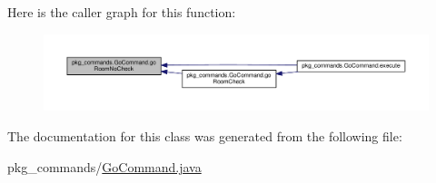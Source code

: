 Here is the caller graph for this function\-:
\nopagebreak
\begin{figure}[H]
\begin{center}
\leavevmode
\includegraphics[width=350pt]{classpkg__commands_1_1GoCommand_a210afbc5f3ef34d3ad5759d853c8f8c2_icgraph}
\end{center}
\end{figure}




The documentation for this class was generated from the following file\-:\begin{DoxyCompactItemize}
\item 
pkg\-\_\-commands/\hyperlink{GoCommand_8java}{Go\-Command.\-java}\end{DoxyCompactItemize}
